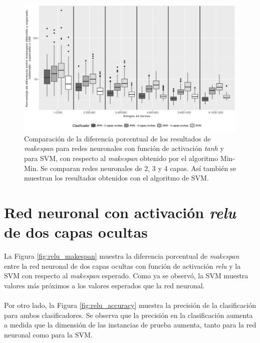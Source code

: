 \begin{figure}[H]
  \centering
  \includegraphics[width=\columnwidth]{imagenes/comparacion_anns_tanh_2.png}
  \caption{Comparación de  la diferencia porcentual  de los resultados de \textit{makespan} para redes neuronales con función de activación \textit{tanh} y para SVM, con respecto al \textit{makespan} obtenido por el algoritmo Min-Min.
Se comparan redes neuronales de 2, 3 y 4 capas.
Así también se muestran los resultados obtenidos con el algoritmo de SVM.}
  \label{fig:tanh234}
\end{figure}

\section{Red neuronal con activación \textit{relu} de dos capas ocultas}

La Figura \ref{fig:relu_makespan} muestra la diferencia porcentual de \textit{makespan} entre la red neuronal de dos capas ocultas con función de activación \textit{relu} y la SVM con respecto al \textit{makespan} esperado.
Como ya se observó, la SVM muestra valores más próximos a los valores esperados que la red neuronal. 

\paragraph{} Por otro lado, la Figura \ref{fig:relu_accuracy} muestra la precisión de la clasificación para ambos clasificadores.
Se observa que la precisión en la clasificación aumenta a medida que la dimensión de las instancias de prueba aumenta, tanto para la red neuronal como para la SVM. 

